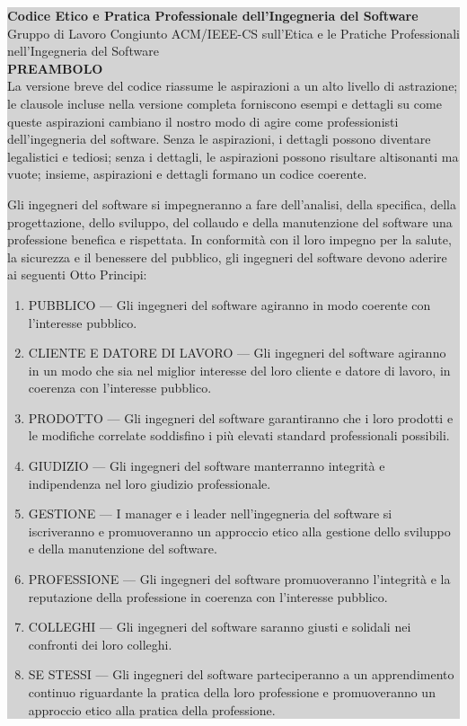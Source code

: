 \begin{center}
\begin{minipage}{\textwidth} %
\colorbox{lightgray}{ %
\parbox{\linewidth}{ %
\textbf{Codice Etico e Pratica Professionale dell'Ingegneria del Software}\\
Gruppo di Lavoro Congiunto ACM/IEEE-CS sull'Etica e le Pratiche Professionali nell'Ingegneria del Software\\
\textbf{PREAMBOLO}\\
La versione breve del codice riassume le aspirazioni a un alto livello di astrazione; le clausole incluse nella versione completa forniscono esempi e dettagli su come queste aspirazioni cambiano il nostro modo di agire come professionisti dell'ingegneria del software. Senza le aspirazioni, i dettagli possono diventare legalistici e tediosi; senza i dettagli, le aspirazioni possono risultare altisonanti ma vuote; insieme, aspirazioni e dettagli formano un codice coerente.

Gli ingegneri del software si impegneranno a fare dell'analisi, della specifica, della progettazione, dello sviluppo, del collaudo e della manutenzione del software una professione benefica e rispettata. In conformità con il loro impegno per la salute, la sicurezza e il benessere del pubblico, gli ingegneri del software devono aderire ai seguenti Otto Principi:
\begin{enumerate}
    \item PUBBLICO — Gli ingegneri del software agiranno in modo coerente con l'interesse pubblico.
    \item CLIENTE E DATORE DI LAVORO — Gli ingegneri del software agiranno in un modo che sia nel miglior interesse del loro cliente e datore di lavoro, in coerenza con l'interesse pubblico.
    \item PRODOTTO — Gli ingegneri del software garantiranno che i loro prodotti e le modifiche correlate soddisfino i più elevati standard professionali possibili.
    \item GIUDIZIO — Gli ingegneri del software manterranno integrità e indipendenza nel loro giudizio professionale.
    \item GESTIONE — I manager e i leader nell'ingegneria del software si iscriveranno e promuoveranno un approccio etico alla gestione dello sviluppo e della manutenzione del software.
    \item PROFESSIONE — Gli ingegneri del software promuoveranno l'integrità e la reputazione della professione in coerenza con l'interesse pubblico.
    \item COLLEGHI — Gli ingegneri del software saranno giusti e solidali nei confronti dei loro colleghi.
    \item SE STESSI — Gli ingegneri del software parteciperanno a un apprendimento continuo riguardante la pratica della loro professione e promuoveranno un approccio etico alla pratica della professione.
\end{enumerate}
}}
\end{minipage}
\end{center}

